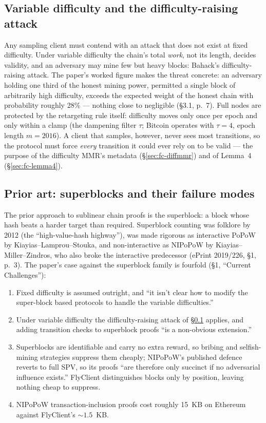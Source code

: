 \documentclass[11pt,a4paper]{article}
\theoremstyle{definition}
\begin{document}
\subsection{Variable difficulty and the difficulty-raising attack}
\label{sec:fc-raising}

Any sampling client must contend with an attack that does not exist at fixed
difficulty. Under variable difficulty the chain's total \emph{work}, not its
length, decides validity, and an adversary may mine few but heavy blocks:
Bahack's difficulty-raising attack. The paper's worked figure makes the
threat concrete: an adversary holding one third of the honest mining power,
permitted a single block of arbitrarily high difficulty, exceeds the
expected weight of the honest chain with probability roughly 28\% ---
nothing close to negligible (\S3.1, p.~7). Full nodes are protected by the
retargeting rule itself: difficulty moves only once per epoch and only
within a clamp (the dampening filter $\tau$; Bitcoin operates with
$\tau = 4$, epoch length $m = 2016$). A client that samples, however, never
sees most transitions, so the protocol must force \emph{every} transition it
could ever rely on to be valid --- the purpose of the difficulty MMR's
metadata (\S\ref{sec:fc-diffmmr}) and of Lemma~4
(\S\ref{sec:fc-lemma4}).

\subsection{Prior art: superblocks and their failure modes}
\label{sec:fc-priorart}

The prior approach to sublinear chain proofs is the superblock: a block
whose hash beats a harder target than required. Superblock counting was
folklore by 2012 (the ``high-value-hash highway''), was made rigorous as
interactive PoPoW by Kiayias--Lamprou--Stouka, and non-interactive as
NIPoPoW by Kiayias--Miller--Zindros, who also broke the interactive
predecessor (ePrint 2019/226, \S1, p.~3). The paper's case against the
superblock family is fourfold (\S1, ``Current Challenges''):

\begin{enumerate}[leftmargin=1.6em]
\item Fixed difficulty is assumed outright, and ``it isn't clear how to
modify the super-block based protocols to handle the variable
difficulties.''
\item Under variable difficulty the difficulty-raising attack of
\S\ref{sec:fc-raising} applies, and adding transition checks to superblock
proofs ``is a non-obvious extension.''
\item Superblocks are identifiable and carry no extra reward, so bribing
and selfish-mining strategies suppress them cheaply; NIPoPoW's published
defence reverts to full SPV, so its proofs ``are therefore only succinct if
no adversarial influence exists.'' FlyClient distinguishes blocks only by
position, leaving nothing cheap to suppress.
\item NIPoPoW transaction-inclusion proofs cost roughly 15~KB on Ethereum
against FlyClient's ${\sim}1.5$~KB.
\end{enumerate}
\end{document}
